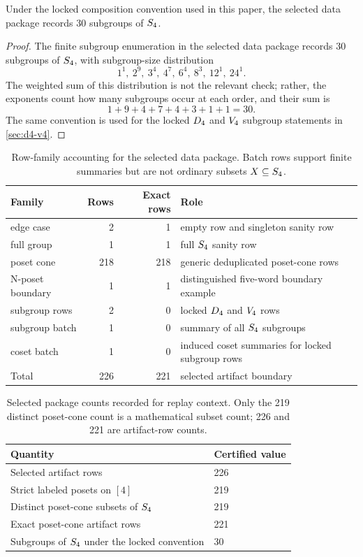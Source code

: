 \begin{certproposition}
\label{prop:s4-subgroup-count}
Under the locked composition convention used in this paper, the selected data package records 30 subgroups of \(S_4\).
\end{certproposition}

\begin{proof}
The finite subgroup enumeration in the selected data package records 30 subgroups of \(S_4\), with subgroup-size distribution
\[
  1^1,\ 2^9,\ 3^4,\ 4^7,\ 6^4,\ 8^3,\ 12^1,\ 24^1.
\]
The weighted sum of this distribution is not the relevant check; rather, the exponents count how many subgroups occur at each order, and their sum is
\[
  1+9+4+7+4+3+1+1=30.
\]
The same convention is used for the locked \(D_4\) and \(V_4\) subgroup statements in \cref{sec:d4-v4}.
\end{proof}

\begin{table}[htbp]
\centering
\small
\begin{tabular}{@{}lrrp{}@{}}
\toprule
Family & Rows & Exact rows & Role \\
\midrule
edge case & 2 & 1 & empty row and singleton sanity row \\
full group & 1 & 1 & full \(S_4\) sanity row \\
poset cone & 218 & 218 & generic deduplicated poset-cone rows \\
N-poset boundary & 1 & 1 & distinguished five-word boundary example \\
subgroup rows & 2 & 0 & locked \(D_4\) and \(V_4\) rows \\
subgroup batch & 1 & 0 & summary of all \(S_4\) subgroups \\
coset batch & 1 & 0 & induced coset summaries for locked subgroup rows \\
\midrule
Total & 226 & 221 & selected artifact boundary \\
\bottomrule
\end{tabular}
\caption{Row-family accounting for the selected data package. Batch rows support finite summaries but are not ordinary subsets \(X\subseteq S_4\).}
\label{tab:atlas-row-family-accounting}
\end{table}

\begin{table}[htbp]
\centering
\begin{tabular}{@{}ll@{}}
\toprule
Quantity & Certified value \\
\midrule
Selected artifact rows & 226 \\
Strict labeled posets on \([4]\) & 219 \\
Distinct poset-cone subsets of \(S_4\) & 219 \\
Exact poset-cone artifact rows & 221 \\
Subgroups of \(S_4\) under the locked convention & 30 \\
\bottomrule
\end{tabular}
\caption{Selected package counts recorded for replay context. Only the 219 distinct poset-cone count is a mathematical subset count; 226 and 221 are artifact-row counts.}
\label{tab:atlas-counts}
\end{table}

